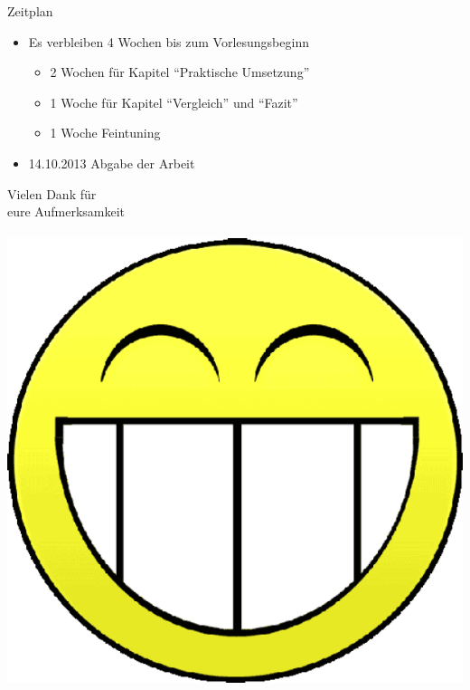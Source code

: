 \documentclass{beamer}
\begin{document}
\begin{frame}{Zeitplan}
  \begin{itemize}
    \item Es verbleiben 4 Wochen bis zum Vorlesungsbeginn
    \begin{itemize}
      \item 2 Wochen für Kapitel "`Praktische Umsetzung"'
      \item 1 Woche für Kapitel "`Vergleich"' und "`Fazit"'
      \item 1 Woche Feintuning
    \end{itemize}
    \item 14.10.2013 Abgabe der Arbeit
  \end{itemize}
\end{frame}

\begin{frame}{}
  \begin{center}
    \begin{LARGE}
      Vielen Dank für\\
      eure Aufmerksamkeit\\
      ~\\
      \includegraphics[scale=0.2]{pic/smilie.png}
    \end{LARGE}
  \end{center}
\end{frame}
\end{document}
